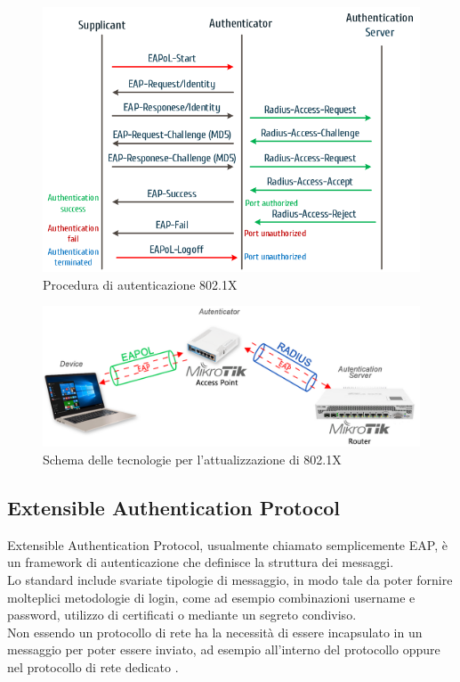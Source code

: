 \documentclass[Tesi.tex]{subfiles}
\begin{document}
\begin{figure}[H]
	\centering
	\includegraphics[width=0.78\linewidth]{"images/8021x-Authentication-message-flow"}
	\caption{Procedura di autenticazione 802.1X}
	\label{fig:Procedura di autenticazione 802.1X}
\end{figure}

\begin{figure}[H]
	\centering
	\includegraphics[width=1\linewidth]{"images/Schema_tecnologie"}
	\caption{Schema delle tecnologie per l'attualizzazione di 802.1X}
	\label{fig:Schema delle tecnologie per l'attualizzazione di 802.1X}
\end{figure}

\subsection{Extensible Authentication Protocol}
Extensible Authentication Protocol, usualmente chiamato semplicemente EAP, è un framework di autenticazione che definisce la struttura dei messaggi. \\
Lo standard include svariate tipologie di messaggio, in modo tale da poter fornire molteplici metodologie di login, come ad esempio combinazioni username e password, utilizzo di certificati o mediante un segreto condiviso. \\
Non essendo un protocollo di rete ha la necessità di essere incapsulato in un messaggio per poter essere inviato, ad esempio all'interno del protocollo  oppure nel protocollo di rete dedicato .
\end{document}
